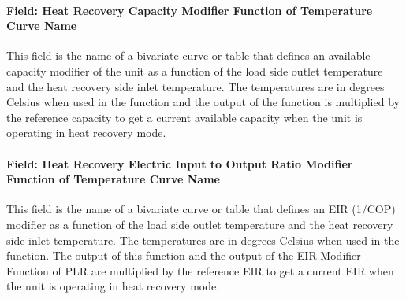 \paragraph{Field: Heat Recovery Capacity Modifier Function of Temperature Curve Name}\label{plhp_eir_heating_inputs_heat_recovery_capft}

This field is the name of a bivariate curve or table that defines an available capacity modifier of the unit as a function of the load side outlet temperature and the heat recovery side inlet temperature. The temperatures are in degrees Celsius when used in the function and the output of the function is multiplied by the reference capacity to get a current available capacity when the unit is operating in heat recovery mode.

\paragraph{Field: Heat Recovery Electric Input to Output Ratio Modifier Function of Temperature Curve Name}\label{plhp_eir_heating_inputs_heat_recovery_eirft}

This field is the name of a bivariate curve or table that defines an EIR (1/COP) modifier as a function of the load side outlet temperature and the heat recovery side inlet temperature. The temperatures are in degrees Celsius when used in the function. The output of this function and the output of the EIR Modifier Function of PLR are multiplied by the reference EIR to get a current EIR when the unit is operating in heat recovery mode.

